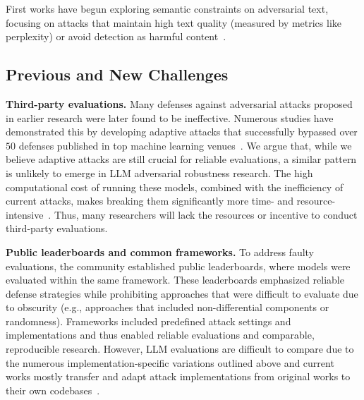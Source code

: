 First works have begun exploring semantic constraints on adversarial text, focusing on attacks that maintain high text quality (measured by metrics like perplexity) or avoid detection as harmful content~\cite{liu2023autodan}.  
\vspace{-5pt}
\subsection{Previous and New Challenges}\label{sec:pos-capability-challenges}


\textbf{Third-party evaluations.} Many defenses against adversarial attacks proposed in earlier research were later found to be ineffective. Numerous studies have demonstrated this by developing adaptive attacks that successfully bypassed over $50$ defenses published in top machine learning venues~\cite{uesato2018adversarial, athalye_obfuscated_2018, tramer_adaptive_2020}. We argue that, while we believe adaptive attacks are still crucial for reliable evaluations, a similar pattern is unlikely to emerge in LLM adversarial robustness research. The high computational cost of running these models, combined with the inefficiency of current attacks, makes breaking them significantly more time- and resource-intensive~\cite{andriushchenko2024jailbreaking}. Thus, many researchers will lack the resources or incentive to conduct third-party evaluations.

\textbf{Public leaderboards and common frameworks.} To address faulty evaluations, the community established public leaderboards, where models were evaluated within the same framework. These leaderboards emphasized reliable defense strategies while prohibiting approaches that were difficult to evaluate due to obscurity (e.g., approaches that included non-differential components or randomness). Frameworks included predefined attack settings and implementations and thus enabled reliable evaluations and comparable, reproducible research. However, LLM evaluations are difficult to compare due to the numerous implementation-specific variations outlined above and current works mostly transfer and adapt attack implementations from original works to their own codebases~\cite{xhonneux2024efficient}. 

\vspace{-5pt}
